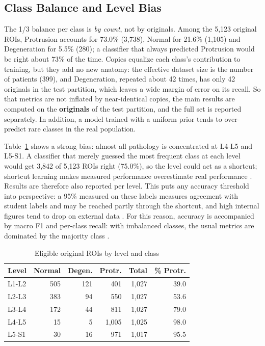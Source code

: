 \subsection{Class Balance and Level Bias}
\label{sec:balance}
The 1/3 balance per class is \emph{by count}, not by originals. Among the 5,123 original ROIs, Protrusion accounts for 73.0\% (3,738), Normal for 21.6\% (1,105) and Degeneration for 5.5\% (280); a classifier that always predicted Protrusion would be right about 73\% of the time. Copies equalize each class's contribution to training, but they add no new anatomy: the effective dataset size is the number of patients (399), and Degeneration, repeated about 42 times, has only 42 originals in the test partition, which leaves a wide margin of error on its recall. So that metrics are not inflated by near-identical copies, the main results are computed on the \textbf{originals} of the test partition, and the full set is reported separately. In addition, a model trained with a uniform prior tends to over-predict rare classes in the real population.

Table~\ref{tab:level} shows a strong bias: almost all pathology is concentrated at L4-L5 and L5-S1. A classifier that merely guessed the most frequent class at each level would get 3,842 of 5,123 ROIs right (75.0\%), so the level could act as a shortcut; shortcut learning makes measured performance overestimate real performance \cite{onglt2024}. Results are therefore also reported per level. This puts any accuracy threshold into perspective: a 95\% measured on these labels measures agreement with student labels and may be reached partly through the shortcut, and high internal figures tend to drop on external data \cite{yi2023}. For this reason, accuracy is accompanied by macro F1 and per-class recall: with imbalanced classes, the usual metrics are dominated by the majority class \cite{mosquera2024}.

\begin{table}[!htb]
\centering\footnotesize
\setlength{\tabcolsep}{4pt}
\caption{Eligible original ROIs by level and class}
\label{tab:level}
\begin{tabular}{lrrrrr}
\toprule
Level & Normal & Degen. & Protr. & Total & \% Protr. \\
\midrule
L1-L2 & 505 & 121 & 401   & 1,027 & 39.0 \\
L2-L3 & 383 & 94  & 550   & 1,027 & 53.6 \\
L3-L4 & 172 & 44  & 811   & 1,027 & 79.0 \\
L4-L5 & 15  & 5   & 1,005 & 1,025 & 98.0 \\
L5-S1 & 30  & 16  & 971   & 1,017 & 95.5 \\
\bottomrule
\end{tabular}
\end{table}
